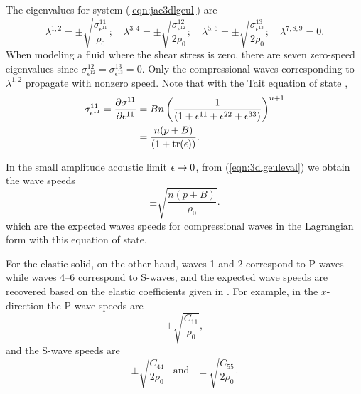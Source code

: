 \documentclass{article}
\begin{document}
The eigenvalues for system (\ref{eqn:jac3dlgeul}) are
\begin{equation}
\lambda^{1,2} = \pm \sqrt{\frac{\sigma^{11}_{\epsilon^{11}}}{\rho_0}}; \quad \lambda^{3,4} = \pm 
\sqrt{\frac{\sigma^{12}_{\epsilon^{12}}}{2\rho_0}}; \quad\lambda^{5,6} = \pm 
\sqrt{\frac{\sigma^{13}_{\epsilon^{13}}}{2\rho_0}}; \quad\lambda^{7,8,9}=0.
\label{eqn:3dlgeuleval}
\end{equation}
When modeling a fluid where the shear stress is zero, there are seven
zero-speed eigenvalues since $\sigma^{12}_{\epsilon^{12}} = 
\sigma^{13}_{\epsilon^{13}} = 0$.  
Only the compressional waves corresponding to $\lambda^{1,2}$ propagate
with nonzero speed.  
Note that with the Tait equation of state ,
\begin{align}
\sigma^{11}_{\epsilon^{11}} =    \frac{\partial\sigma^{11}}{\partial\epsilon^{11}} &= B n \left( \frac{1}{(1+\epsilon^{11} + \epsilon^{22} + \epsilon^{33})} 
\right )^{n +1} \label{eqn:sigepstait}\\
			&=  \frac{n(p+B)}{(1+\text{tr}(\epsilon))}.\notag
\end{align}

In the small amplitude acoustic limit $\epsilon\rightarrow 0$,
from (\ref{eqn:3dlgeuleval}) we obtain the wave speeds 
\begin{equation}
	\pm \sqrt{\frac{n (p+B)}{\rho_0}}.
\label{eqn:lagisenspeed}
\end{equation}
which are the expected waves speeds for compressional waves in the Lagrangian form with this
equation of state.

For the elastic solid, on the other hand, waves 1 and 2 correspond to P-waves while waves 4--6
correspond to S-waves, and the expected wave speeds are recovered based on the elastic
coefficients given in .  For example, in the $x$-direction the P-wave speeds are
\begin{equation}
	\pm \sqrt{\frac{C_{11}}{\rho_0}},
\end{equation}
and the S-wave speeds are
\begin{equation}
	\pm \sqrt{\frac{C_{44}}{2\rho_0}} ~~\text{  and  }~~ \pm \sqrt{\frac{C_{55}}{2\rho_0}}.
\end{equation}
\end{document}
